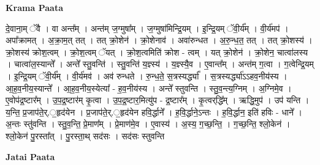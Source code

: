 \documentclass[17pt]{extarticle}
\begin{document}
\textbf{Krama Paata} \newline

दे॒वाना॒म् ॅवै । वा अन्त᳚म् । अन्त॑म् ज॒ग्मुषा᳚म् । ज॒ग्मुषा॑मिन्द्रि॒यम् । इ॒न्द्रि॒यम् ॅवी॒र्य᳚म् । वी॒र्य॑मप॑ । अपा᳚क्रामत् । अ॒क्रा॒म॒त् तत् । तत् क्रो॒शेन॑ । क्रो॒शेनाव॑ । अवा॑रुन्धत । अ॒रु॒न्ध॒त॒ तत् । तत् क्रो॒शस्य॑ । क्रो॒शस्य॑ क्रोश॒त्वम् । क्रो॒श॒त्वम् ॅयत् । क्रो॒श॒त्वमिति॑ क्रोश - त्वम् । यत् क्रो॒शेन॑ । क्रो॒शेन॒ चात्वा॑लस्य । चात्वा॑ल॒स्यान्ते᳚ । अन्ते᳚ स्तु॒वन्ति॑ । स्तु॒वन्ति॑ य॒ज्ञ्स्य॑ । य॒ज्ञ्स्यै॒व । ए॒वान्त᳚म् । अन्त॑म् ग॒त्वा । ग॒त्वेन्द्रि॒यम् । इ॒न्द्रि॒यम् ॅवी॒र्य᳚म् । वी॒र्य॑मव॑ । अव॑ रुन्धते । रु॒न्ध॒ते॒ स॒त्रस्यर्द्ध्या᳚ । स॒त्रस्यर्द्ध्या॑ऽऽहव॒नीय॑स्य । आ॒ह॒व॒नीय॒स्यान्ते᳚ । आ॒ह॒व॒नीय॒स्येत्या᳚ - ह॒व॒नीय॑स्य । अन्ते᳚ स्तुवन्ति । स्तु॒व॒न्त्य॒ग्निम् । अ॒ग्निमे॒व । ए॒वोप॑द्र॒ष्टार᳚म् । उ॒प॒द्र॒ष्टार॑म् कृ॒त्वा । उ॒प॒द्र॒ष्टार॒मित्यु॑प - द्र॒ष्टार᳚म् । कृ॒त्वर्‌द्धि᳚म् । ऋद्धि॒मुप॑ । उप॑ यन्ति । य॒न्ति॒ प्र॒जाप॑ते॒र्.॒हृद॑येन । प्र॒जाप॑ते॒र्.॒हृद॑येन हवि॒र्द्धाने᳚ । ह॒वि॒र्द्धाने॒ऽन्तः । ह॒वि॒र्द्धान॒ इति॑ हविः - धाने᳚ । अ॒न्तः स्तु॑वन्ति । स्तु॒व॒न्ति॒ प्रे॒माण᳚म् । प्रे॒माण॑मे॒व । ए॒वास्य॑ । अ॒स्य॒ ग॒च्छ॒न्ति॒ । ग॒च्छ॒न्ति॒ श्लो॒केन॑ । श्लो॒केन॑ पु॒रस्ता᳚त् । पु॒रस्ता॒थ् सद॑सः । सद॑सः स्तुवन्ति \newline

\textbf{Jatai Paata} \newline
\end{document}
